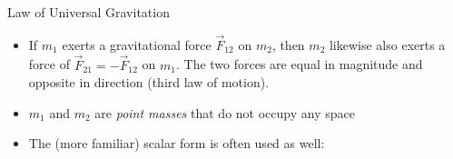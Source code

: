 \documentclass[12pt,compress,aspectratio=169]{beamer}
\begin{document}
\begin{frame}{Law of Universal Gravitation}
  \begin{center}
  \end{center}
  \begin{itemize}
  \item If $m_1$ exerts a gravitational force $\vec F_{12}$ on
    $m_2$, then $m_2$ likewise also exerts a force of $\vec F_{21}=-\vec F_{12}$
    on $m_1$. The two forces are equal in magnitude and opposite in direction
    (third law of motion).
  \item $m_1$ and $m_2$ are \emph{point masses} that do not occupy any space
  \item The (more familiar) scalar form is often used as well:

  \end{itemize}
\end{frame}
\end{document}
